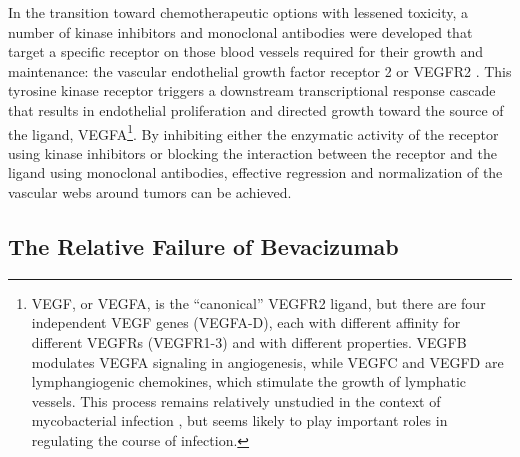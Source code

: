 In the transition toward chemotherapeutic options with lessened toxicity, a number of kinase inhibitors and monoclonal antibodies were developed that target a specific receptor on those blood vessels required for their growth and maintenance: the vascular endothelial growth factor receptor 2 or VEGFR2 \citep{Potente2011, Ranieri2014, Shibuya2011, Welti2013}. This tyrosine kinase receptor triggers a downstream transcriptional response cascade that results in endothelial proliferation and directed growth toward the source of the ligand, VEGFA\footnote{VEGF, or VEGFA, is the ``canonical'' VEGFR2 ligand, but there are four independent VEGF genes (VEGFA\hyp{}D), each with different affinity for different VEGFRs (VEGFR1\hyp{}3) and with different properties. VEGFB modulates VEGFA signaling in angiogenesis, while VEGFC and VEGFD are lymphangiogenic chemokines, which stimulate the growth of lymphatic vessels. This process remains relatively unstudied in the context of mycobacterial infection \citep{Harding2015}, but seems likely to play important roles in regulating the course of infection.}. By inhibiting either the enzymatic activity of the receptor using kinase inhibitors or blocking the interaction between the receptor and the ligand using monoclonal antibodies, effective regression and normalization of the vascular webs around tumors can be achieved. 

\subsection{The Relative Failure of Bevacizumab}\label{bevacizumab}

